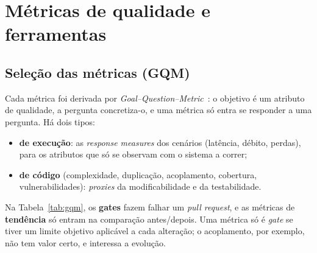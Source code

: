 \section{Métricas de qualidade e ferramentas}
\label{sec:metricas}

\subsection{Seleção das métricas (GQM)}
\label{sec:gqm}

Cada métrica foi derivada por \emph{Goal--Question--Metric}~\cite{basili1994}: o objetivo é um atributo de
qualidade, a pergunta concretiza-o, e uma métrica só entra se responder a uma pergunta. Há dois tipos:
\begin{itemize}
  \item \textbf{de execução}: as \emph{response measures} dos cenários (latência, débito, perdas), para os atributos
        que só se observam com o sistema a correr;
  \item \textbf{de código} (complexidade, duplicação, acoplamento, cobertura, vulnerabilidades): \emph{proxies} da
        modificabilidade e da testabilidade.
\end{itemize}
Na Tabela~\ref{tab:gqm}, os \textbf{gates} fazem falhar um \emph{pull request}, e as métricas de \textbf{tendência}
só entram na comparação antes/depois. Uma métrica só é \emph{gate} se tiver um limite objetivo aplicável a cada
alteração; o acoplamento, por exemplo, não tem valor certo, e interessa a evolução.


